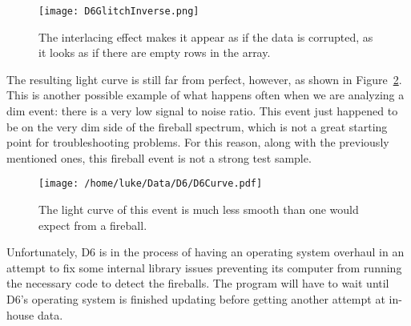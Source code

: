 \begin{figure}[ht!]
	\centering
	\texttt{[image: D6GlitchInverse.png]}
	\caption{The interlacing effect makes it appear as if the data is corrupted, as it looks as if there are empty rows in the array.}
	\label{fig:D6Glitch}
\end{figure}

The resulting light curve is still far from perfect, however, as shown in Figure~\ref{fig:D6LightCurve}. This is another possible example of what happens often when we are analyzing a dim event: there is a very low signal to noise ratio. This event just happened to be on the very dim side of the fireball spectrum, which is not a great starting point for troubleshooting problems. For this reason, along with the previously mentioned ones, this fireball event is not a strong test sample.

\begin{figure}[ht!]
	\centering
	\texttt{[image: /home/luke/Data/D6/D6Curve.pdf]}
	\caption{The light curve of this event is much less smooth than one would expect from a fireball.}
	\label{fig:D6LightCurve}
\end{figure}

Unfortunately, D6 is in the process of having an operating system overhaul in an attempt to fix some internal library issues preventing its computer from running the necessary code to detect the fireballs. The program will have to wait until D6's operating system is finished updating before getting another attempt at in-house data. 
